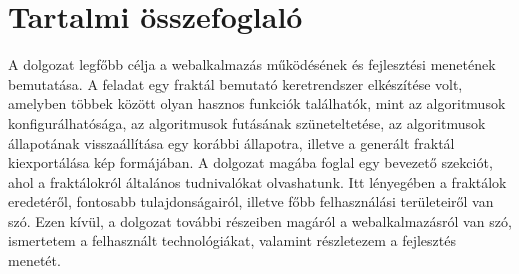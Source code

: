 \chapter*{Tartalmi összefoglaló}
A dolgozat legfőbb célja a webalkalmazás működésének és fejlesztési menetének bemutatása. A feladat egy fraktál bemutató keretrendszer elkészítése volt, amelyben többek között olyan hasznos funkciók találhatók, mint az algoritmusok konfigurálhatósága, az algoritmusok futásának szüneteltetése, az algoritmusok állapotának visszaállítása egy korábbi állapotra, illetve a generált fraktál kiexportálása kép formájában. A dolgozat magába foglal egy bevezető szekciót, ahol a fraktálokról általános tudnivalókat olvashatunk. Itt lényegében a fraktálok eredetéről, fontosabb tulajdonságairól, illetve főbb felhasználási területeiről van szó. Ezen kívül, a dolgozat további részeiben magáról a webalkalmazásról van szó, ismertetem a felhasznált technológiákat, valamint részletezem a fejlesztés menetét.